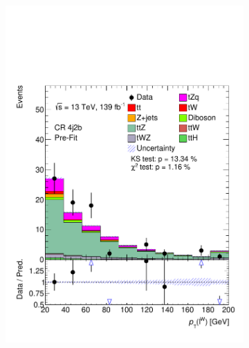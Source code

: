 \begin{figure}[!h]
\begin{subfigure}[b]{0.33\linewidth}
    \includegraphics[width=\linewidth]{ubonn-thesis/Chapters/Chapters_06/Figure/Input_distribution/CR_4j2b_lepW_pt.pdf} 
  \end{subfigure}%
  \begin{subfigure}[b]{0.33\linewidth}
    \centering

\end{subfigure}
\end{figure}
